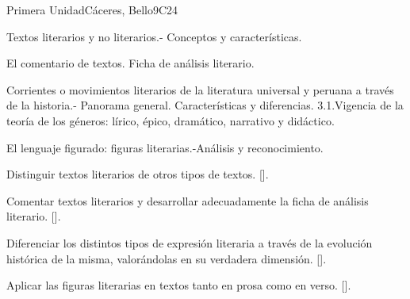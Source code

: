 \begin{syllabus}
\begin{outcomes}
    \item {}
    \item {}
\end{outcomes}
\begin{competences}
    \item {}
\end{competences}

\begin{unit}{}{Primera Unidad}{Cáceres, Bello}{9}{C24}
\begin{topics}
	\item Textos literarios y no literarios.- Conceptos y características.
	\item El comentario de textos. Ficha de análisis literario.
	\item Corrientes o movimientos literarios de la literatura universal y peruana a través de la historia.- Panorama general. Características y diferencias.
	3.1.Vigencia de la teoría de los géneros: lírico, épico, dramático, narrativo y didáctico.
	\item El lenguaje figurado: figuras literarias.-Análisis y reconocimiento.
\end{topics}
\begin{learningoutcomes}
	\item Distinguir textos literarios de otros tipos de textos. [\Usage].
	\item Comentar textos literarios y desarrollar adecuadamente la ficha de análisis literario. [\Usage].
	\item Diferenciar los distintos tipos de expresión literaria a través de la evolución histórica de la misma, valorándolas en su verdadera dimensión. [\Usage].
	\item Aplicar las figuras literarias en textos tanto en prosa como en verso. [\Usage].
\end{learningoutcomes}
\end{unit}


\end{syllabus}
